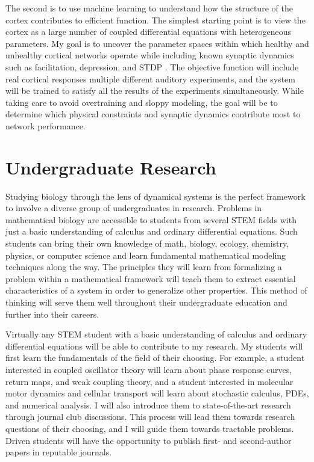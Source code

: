 \documentclass[a4paper,11pt]{article}
\begin{document}
	The second is to use machine learning to understand how the structure of the cortex contributes to efficient function. The simplest starting point is to view the cortex as a large number of coupled differential equations with heterogeneous parameters. My goal is to uncover the parameter spaces within which healthy and unhealthy cortical networks operate while including known synaptic dynamics such as facilitation, depression, and STDP \cite{lee2018training}. The objective function will include real cortical responses multiple different auditory experiments, and the system will be trained to satisfy all the results of the experiments simultaneously. While taking care to avoid overtraining and sloppy modeling, the goal will be to determine which physical constraints and synaptic dynamics contribute most to network performance.
	
	
	\section{Undergraduate Research}\label{sec:undergrad}
	
	Studying biology through the lens of dynamical systems is the perfect framework to involve a diverse group of undergraduates in research. Problems in mathematical biology are accessible to students from several STEM fields with just a basic understanding of calculus and ordinary differential equations. Such students can bring their own knowledge of math, biology, ecology, chemistry, physics, or computer science and learn fundamental mathematical modeling techniques along the way. The principles they will learn from formalizing a problem within a mathematical framework will teach them to extract essential characteristics of a system in order to generalize other properties. This method of thinking will serve them well throughout their undergraduate education and further into their careers.
	
	Virtually any STEM student with a basic understanding of calculus and ordinary differential equations will be able to contribute to my research. My students will first learn the fundamentals of the field of their choosing. For example, a student interested in coupled oscillator theory will learn about phase response curves, return maps, and weak coupling theory, and a student interested in molecular motor dynamics and cellular transport will learn about stochastic calculus, PDEs, and numerical analysis. I will also introduce them to state-of-the-art research through journal club discussions. This process will lead them towards research questions of their choosing, and I will guide them towards tractable problems. Driven students will have the opportunity to publish first- and second-author papers in reputable journals.
	
\end{document}
